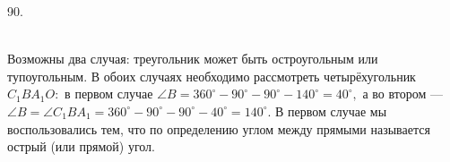 90. \begin{figure}[ht!]
\end{figure}\\
Возможны два случая: треугольник может быть остроугольным или тупоугольным. В обоих случаях необходимо рассмотреть четырёхугольник $C_1BA_1O:$ в первом случае $\angle B =360^\circ-90^\circ-90^\circ-140^\circ=40^\circ,$ а во втором --- $\angle B=\angle C_1BA_1=360^\circ-90^\circ-90^\circ-40^\circ=140^\circ.$ В первом случае мы воспользовались тем, что по определению углом между прямыми называется острый (или прямой) угол.\\
